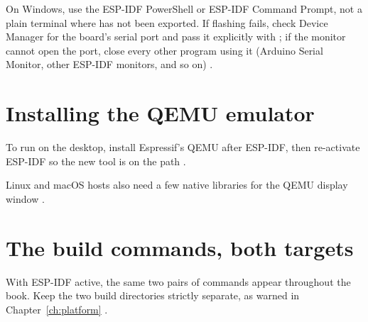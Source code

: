 

\begin{prgwarn}
On Windows, use the ESP-IDF PowerShell or ESP-IDF Command Prompt, not a plain
terminal where  has not been exported. If flashing fails, check Device
Manager for the board's serial port and pass it explicitly with ; if
the monitor cannot open the port, close every other program using it (Arduino
Serial Monitor, other ESP-IDF monitors, and so on) \citep{prg32repo}.
\end{prgwarn}

\section{Installing the QEMU emulator}

To run on the desktop, install Espressif's \riscv QEMU after ESP-IDF, then
re-activate ESP-IDF so the new tool is on the path \citep{prg32qemu}.



Linux and macOS hosts also need a few native libraries for the QEMU display window
\citep{prg32qemu}.



\section{The build commands, both targets}

With ESP-IDF active, the same two pairs of commands appear throughout the book.
Keep the two build directories strictly separate, as warned in
Chapter~\ref{ch:platform} \citep{prg32qemu}.





